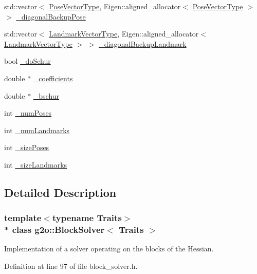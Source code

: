 \begin{DoxyCompactItemize}
\item 
std\+::vector$<$ \hyperlink{classg2o_1_1BlockSolver_a65d51b9281e2e2597df05eb00801ee76}{Pose\+Vector\+Type}, Eigen\+::aligned\+\_\+allocator$<$ \hyperlink{classg2o_1_1BlockSolver_a65d51b9281e2e2597df05eb00801ee76}{Pose\+Vector\+Type} $>$ $>$ \hyperlink{classg2o_1_1BlockSolver_a3cb6f86c522c2ea26478ad44b7c32f76}{\+\_\+diagonal\+Backup\+Pose}
\item 
std\+::vector$<$ \hyperlink{classg2o_1_1BlockSolver_a19ade5e432f32e46557192ae75074304}{Landmark\+Vector\+Type}, Eigen\+::aligned\+\_\+allocator$<$ \hyperlink{classg2o_1_1BlockSolver_a19ade5e432f32e46557192ae75074304}{Landmark\+Vector\+Type} $>$ $>$ \hyperlink{classg2o_1_1BlockSolver_a3bc5b19faa2c45e2c04a6743b3a083de}{\+\_\+diagonal\+Backup\+Landmark}
\item 
bool \hyperlink{classg2o_1_1BlockSolver_ab375a5fac964182442f38288bd8a103a}{\+\_\+do\+Schur}
\item 
double $\ast$ \hyperlink{classg2o_1_1BlockSolver_a416f480d4b27d7f8962ae7ae363f2e32}{\+\_\+coefficients}
\item 
double $\ast$ \hyperlink{classg2o_1_1BlockSolver_aafddeb1d0a4218fc9c3c77169e20f81a}{\+\_\+bschur}
\item 
int \hyperlink{classg2o_1_1BlockSolver_a709259fc290d746f4174d25410b7458a}{\+\_\+num\+Poses}
\item 
int \hyperlink{classg2o_1_1BlockSolver_ab98231b7ca8e6d7f138c33d26c6f4326}{\+\_\+num\+Landmarks}
\item 
int \hyperlink{classg2o_1_1BlockSolver_a39ec000379885ce09cdd8c23ab6d4567}{\+\_\+size\+Poses}
\item 
int \hyperlink{classg2o_1_1BlockSolver_a13a49b5aac8ae3b12ed0c349fc0788e7}{\+\_\+size\+Landmarks}
\end{DoxyCompactItemize}


\subsection{Detailed Description}
\subsubsection*{template$<$typename Traits$>$\\*
class g2o\+::\+Block\+Solver$<$ Traits $>$}

Implementation of a solver operating on the blocks of the Hessian. 

Definition at line 97 of file block\+\_\+solver.\+h.



